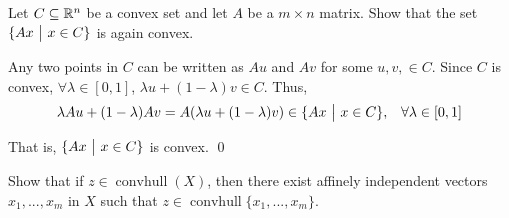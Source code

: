 \documentclass[10pt]{article}
\newcommand{\convhull}{\operatorname{convhull}}
\begin{document}
\maketitle


\begin{problem}[Exercise 2.2]
    Let \( C \subseteq \mathbb{R}^n \) be a convex set and let \( A \) be a \( m\times n \) matrix. Show that the set \( \{Ax ~\big|~ x\in C \} \) is again convex.
\end{problem}

\begin{solution}

Any two points in \( C \) can be written as \( Au \) and \( Av \) for some \( u,v,\in C \). Since \( C \) is convex, \( \forall \lambda\in[0,1]\), \( \lambda u + (1-\lambda)v \in C \). Thus,
\begin{align*}
    \lambda Au + (1-\lambda)Av = A(\lambda u+ (1-\lambda)v) \in \{Ax ~\big|~ x\in C \}, && \forall  \lambda\in[0,1] 
\end{align*}

That is, \( \{Ax ~\big|~ x\in C\} \) is convex. \qed

\end{solution}

\begin{problem}[Exercise 2.4]
    Show that if \( z\in\convhull(X) \), then there exist affinely independent vectors \( x_1, ..., x_m \) in \( X \) such that \( z\in \convhull\{x_1, ..., x_m\} \). 
\end{problem}
\end{document}

